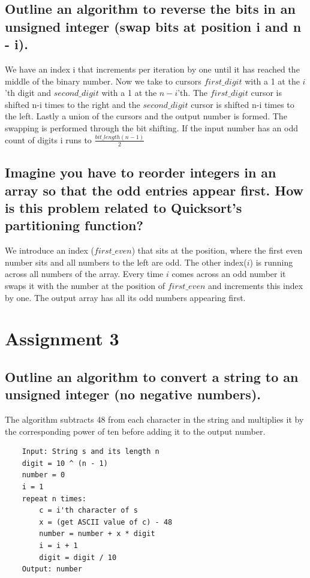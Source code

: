 \documentclass[runningheads]{llncs}
\begin{document}
\subsection*{Outline an algorithm to reverse the bits in an unsigned integer (swap bits at position i and n - i).}
We have an index i that increments per iteration by one until it has reached the middle of the binary number. Now
we take to cursors $first\_digit$ with a 1 at the $i$'th digit and $second\_digit$ with a 1 at the $n-i$'th. The
$first\_digit$ cursor is shifted n-i times to the right and the $second\_digit$ cursor is shifted n-i times to the
left. Lastly a union of the cursors and the output number is formed. The swapping is performed through the bit shifting.
If the input number has an odd count of digits i runs to $\frac{bit\_length(n - 1)}{2}$

\subsection*{Imagine you have to reorder integers in an array so that the odd entries appear first. How is this problem related to Quicksort’s partitioning function?}
We introduce an index ($first\_even$) that sits at the position, where the first even number sits and all numbers to
the left are odd. The other index($i$) is running across all numbers of the array. Every time $i$ comes across an odd
number it swaps it with the number at the position of $first\_even$ and increments this index by one. The output array
has all its odd numbers appearing first.

\section*{Assignment 3}

\subsection*{Outline an algorithm to convert a string to an unsigned integer (no negative numbers).}
The algorithm subtracts 48 from each character in the string and multiplies it by the corresponding power
of ten before adding it to the output number.

\begin{verbatim}
    Input: String s and its length n
    digit = 10 ^ (n - 1)
    number = 0
    i = 1
    repeat n times:
        c = i'th character of s
        x = (get ASCII value of c) - 48
        number = number + x * digit
        i = i + 1
        digit = digit / 10
    Output: number
\end{verbatim}
\end{document}
